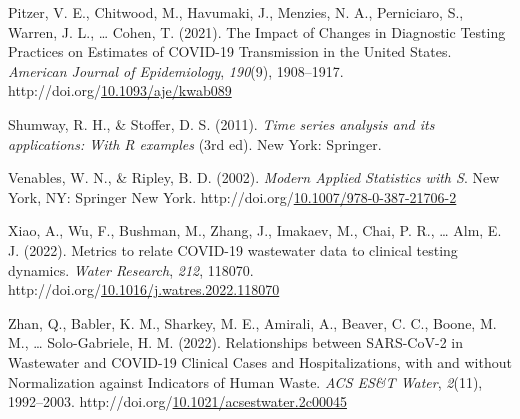 \documentclass[12pt,twoside]{smiththesis}
\newlength{\cslhangindent}
\newenvironment{CSLReferences}[2] %
 {%
\setlength{\parindent}{0pt}
\ifodd #1 \everypar{\setlength{\hangindent}{\cslhangindent}}\ignorespaces\fi
\ifnum #2 > 0
\setlength{\parskip}{#2\baselineskip}
  \fi
}%
{}
\begin{document}
\begin{CSLReferences}{1}{0}
\leavevmode{}%
Pitzer, V. E., Chitwood, M., Havumaki, J., Menzies, N. A., Perniciaro, S., Warren, J. L., \ldots{} Cohen, T. (2021). The {Impact} of {Changes} in {Diagnostic Testing Practices} on {Estimates} of {COVID-19 Transmission} in the {United States}. \emph{American Journal of Epidemiology}, \emph{190}(9), 1908--1917. http://doi.org/\href{https://doi.org/10.1093/aje/kwab089}{10.1093/aje/kwab089}

\leavevmode{}%
Shumway, R. H., \& Stoffer, D. S. (2011). \emph{Time series analysis and its applications: With {R} examples} (3rd ed). {New York}: {Springer}.

\leavevmode{}%
Venables, W. N., \& Ripley, B. D. (2002). \emph{Modern {Applied Statistics} with {S}}. {New York, NY}: {Springer New York}. http://doi.org/\href{https://doi.org/10.1007/978-0-387-21706-2}{10.1007/978-0-387-21706-2}

\leavevmode{}%
Xiao, A., Wu, F., Bushman, M., Zhang, J., Imakaev, M., Chai, P. R., \ldots{} Alm, E. J. (2022). Metrics to relate {COVID-19} wastewater data to clinical testing dynamics. \emph{Water Research}, \emph{212}, 118070. http://doi.org/\href{https://doi.org/10.1016/j.watres.2022.118070}{10.1016/j.watres.2022.118070}

\leavevmode{}%
Zhan, Q., Babler, K. M., Sharkey, M. E., Amirali, A., Beaver, C. C., Boone, M. M., \ldots{} Solo-Gabriele, H. M. (2022). Relationships between {SARS-CoV-2} in {Wastewater} and {COVID-19 Clinical Cases} and {Hospitalizations}, with and without {Normalization} against {Indicators} of {Human Waste}. \emph{ACS ES\&T Water}, \emph{2}(11), 1992--2003. http://doi.org/\href{https://doi.org/10.1021/acsestwater.2c00045}{10.1021/acsestwater.2c00045}

\end{CSLReferences}

\end{document}
